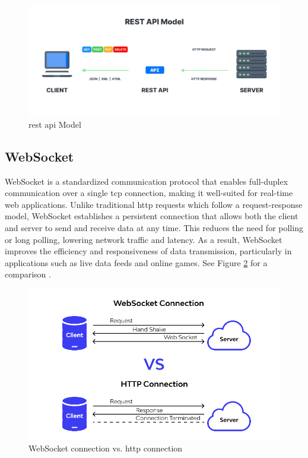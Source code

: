 \begin{figure}[h!]
\centering
\includegraphics[width=0.95\linewidth]{figures/theory/rest.png}
\caption[REST API Model]{\gls{rest} \gls{api} Model}
\label{fig:rest-api-model}
\end{figure}

\subsection{WebSocket}
\label{subsec:websocket}

WebSocket is a standardized communication protocol that enables full-duplex communication over a single \gls{tcp} connection, making it well-suited for real-time web applications. Unlike traditional \gls{http} requests which follow a request-response model, WebSocket establishes a persistent connection that allows both the client and server to send and receive data at any time. This reduces the need for polling or long polling, lowering network traffic and latency. As a result, WebSocket improves the efficiency and responsiveness of data transmission, particularly in applications such as live data feeds and online games. See Figure \ref{fig:websocket-vs-http} for a comparison \cite{nodejs:websocket, apidog:websocket}.

\begin{figure}[h!]
    \centering
    \includegraphics[width=0.8\linewidth]{figures/theory/websocket-vs-http.png}
    \caption[WebSocket connection vs. HTTP connection]{WebSocket connection vs. \gls{http} connection \cite{apidog:websocket}}
    \label{fig:websocket-vs-http}
\end{figure}

